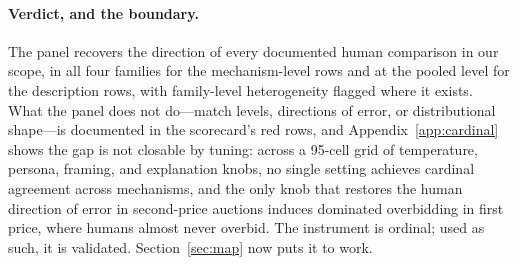 \paragraph{Verdict, and the boundary.}
The panel recovers the direction of every documented human comparison in our scope, in all four families for the mechanism-level rows and at the pooled level for the description rows, with family-level heterogeneity flagged where it exists. What the panel does not do---match levels, directions of error, or distributional shape---is documented in the scorecard's red rows, and Appendix~\ref{app:cardinal} shows the gap is not closable by tuning: across a 95-cell grid of temperature, persona, framing, and explanation knobs, no single setting achieves cardinal agreement across mechanisms, and the only knob that restores the human direction of error in second-price auctions induces dominated overbidding in first price, where humans almost never overbid. The instrument is ordinal; used as such, it is validated. Section~\ref{sec:map} now puts it to work.
